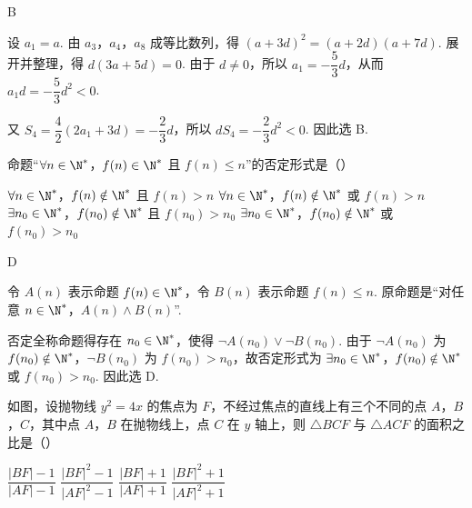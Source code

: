 \begin{answer}
B
\end{answer}

\begin{solution}
设 \(a_1=a\). 由 \(a_3\)，\(a_4\)，\(a_8\) 成等比数列，得
\((a+3d)^2=(a+2d)(a+7d)\). 展开并整理，得
\(d(3a+5d)=0\). 由于 \(d\neq0\)，所以 \(a_1=-\dfrac{5}{3}d\)，从而
\(a_1d=-\dfrac{5}{3}d^2<0\).

又 \(S_4=\dfrac{4}{2}(2a_1+3d)=-\dfrac{2}{3}d\)，所以
\(dS_4=-\dfrac{2}{3}d^2<0\). 因此选 B.
\end{solution}

\begin{problem}
命题“\(\forall n \in \N^*\)，\(f(n) \in \N^*\) 且 \(f(n) \leqslant n\)”的否定形式是（\quad）

\choices
    {\(\forall n\in \N^*\)，\(f(n)\notin \N^*\) 且 \(f(n) > n\)}
    {\(\forall n\in \N^*\)，\(f(n)\notin \N^*\) 或 \(f(n) > n\)}
    {\(\exists n_0\in \N^*\)，\(f(n_0)\notin \N^*\) 且 \(f(n_0) > n_0\)}
    {\(\exists n_0\in \N^*\)，\(f(n_0)\notin \N^*\) 或 \(f(n_0) > n_0\)}
\end{problem}

\begin{answer}
D
\end{answer}

\begin{solution}
令 \(A(n)\) 表示命题 \(f(n)\in\N^*\)，令 \(B(n)\) 表示命题 \(f(n)\leqslant n\). 原命题是“对任意 \(n\in\N^*\)，\(A(n)\land B(n)\)”.

否定全称命题得存在 \(n_0\in\N^*\)，使得 \(\neg A(n_0)\lor\neg B(n_0)\). 由于
\(\neg A(n_0)\) 为 \(f(n_0)\notin\N^*\)，\(\neg B(n_0)\) 为 \(f(n_0)>n_0\)，故否定形式为
\(\exists n_0\in\N^*\)，\(f(n_0)\notin\N^*\) 或 \(f(n_0)>n_0\). 因此选 D.
\end{solution}

\begin{problem}
如图，设抛物线 \(y^{2} = 4x\) 的焦点为 \(F\)，不经过焦点的直线上有三个不同的点 \(A\)，\(B\)，\(C\)，其中点 \(A\)，\(B\) 在抛物线上，点 \(C\) 在 \(y\) 轴上，则 \(\triangle BCF\) 与 \(\triangle ACF\) 的面积之比是（\quad）


\choices
    {\(\dfrac{|BF| - 1}{|AF| - 1}\)}
    {\(\dfrac{|BF|^2 - 1}{|AF|^2 - 1}\)}
    {\(\dfrac{|BF| + 1}{|AF| + 1}\)}
    {\(\dfrac{|BF|^2 + 1}{|AF|^2 + 1}\)}
\end{problem}

